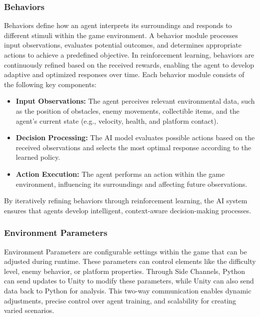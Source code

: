 \documentclass[12pt,oneside,openright,a4paper]{cpe-english-project}
\begin{document}
\subsubsection{Behaviors}
Behaviors define how an agent interprets its surroundings and responds to different stimuli within the game environment. A behavior module processes input observations, evaluates potential outcomes, and determines appropriate actions to achieve a predefined objective. In reinforcement learning, behaviors are continuously refined based on the received rewards, enabling the agent to develop adaptive and optimized responses over time.
Each behavior module consists of the following key components:
\begin{itemize}
\item  \textbf{Input Observations:} The agent perceives relevant environmental data, such as the position of obstacles, enemy movements, collectible items, and the agent’s current state (e.g., velocity, health, and platform contact).
\item  \textbf{Decision Processing:} The AI model evaluates possible actions based on the received observations and selects the most optimal response according to the learned policy.
\item  \textbf{Action Execution:} The agent performs an action within the game environment, influencing its surroundings and affecting future observations.
\end{itemize}
By iteratively refining behaviors through reinforcement learning, the AI system ensures that agents develop intelligent, context-aware decision-making processes.
\subsubsection{Environment Parameters}
Environment Parameters are configurable settings within the game that can be adjusted during runtime. These parameters can control elements like the difficulty level, enemy behavior, or platform properties. Through Side Channels, Python can send updates to Unity to modify these parameters, while Unity can also send data back to Python for analysis. This two-way communication enables dynamic adjustments, precise control over agent training, and scalability for creating varied scenarios.
\end{document}
